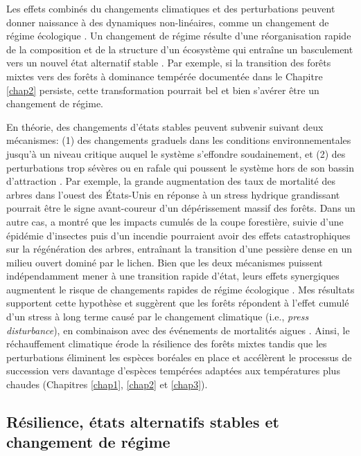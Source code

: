 Les effets combinés du changements climatiques et des perturbations
peuvent donner naissance à des dynamiques non-linéaires, comme un
changement de régime écologique \citep[Fig.
\ref{fig4.2};][]{scheffer_catastrophic_2001, harris_biological_2018}. Un
changement de régime résulte d'une réorganisation rapide de la
composition et de la structure d'un écosystème qui entraîne un
basculement vers un nouvel état alternatif stable
\citep{scheffer_catastrophic_2001}. Par exemple, si la transition des
forêts mixtes vers des forêts à dominance tempérée documentée dans le
Chapitre \ref{chap2} persiste, cette transformation pourrait bel et bien
s'avérer être un changement de régime.

En théorie, des changements d'états stables peuvent subvenir suivant
deux mécanismes: (1) des changements graduels dans les conditions
environnementales jusqu'à un niveau critique auquel le système
s'effondre soudainement, et (2) des perturbations trop sévères ou en
rafale qui poussent le système hors de son bassin d'attraction
\citep{scheffer_catastrophic_2001}. Par exemple, la grande augmentation
des taux de mortalité des arbres dans l'ouest des États-Unis en réponse
à un stress hydrique grandissant \citep{van_mantgem_apparent_2007}
pourrait être le signe avant-coureur d'un dépérissement massif des
forêts. Dans un autre cas, \citet{payette_shift_2003} a montré que les
impacts cumulés de la coupe forestière, suivie d'une épidémie d'insectes
puis d'un incendie pourraient avoir des effets catastrophiques sur la
régénération des arbres, entraînant la transition d'une pessière dense
en un milieu ouvert dominé par le lichen. Bien que les deux mécanismes
puissent indépendamment mener à une transition rapide d'état, leurs
effets synergiques augmentent le risque de changements rapides de régime
écologique \citep{scheffer_catastrophic_2001, harris_biological_2018}.
Mes résultats supportent cette hypothèse et suggèrent que les forêts
répondent à l'effet cumulé d'un stress à long terme causé par le
changement climatique (i.e., \emph{press disturbance}), en combinaison
avec des événements de mortalités aigues \citep[i.e., \emph{pulse
disturbance};][]{harris_biological_2018}. Ainsi, le réchauffement
climatique érode la résilience des forêts mixtes tandis que les
perturbations éliminent les espèces boréales en place et accélèrent le
processus de succession vers davantage d'espèces tempérées adaptées aux
températures plus chaudes (Chapitres \ref{chap1}, \ref{chap2} et
\ref{chap3}).

\hypertarget{ruxe9silience-uxe9tats-alternatifs-stables-et-changement-de-ruxe9gime}{%
\subsection{Résilience, états alternatifs stables et changement de
régime}\label{ruxe9silience-uxe9tats-alternatifs-stables-et-changement-de-ruxe9gime}}

